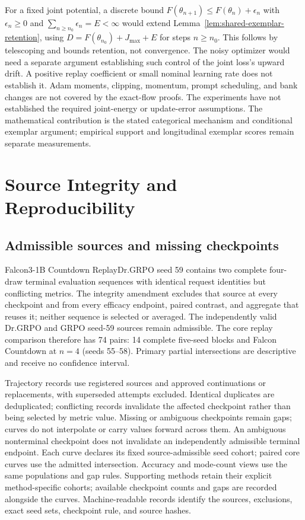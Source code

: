 \documentclass{article}
\newcommand{\1}{\mathbf 1}
\theoremstyle{remark}
\theoremstyle{definition}
\theoremstyle{plain}
\begin{document}
For a fixed joint potential, a discrete bound
$F(\theta_{n+1})\le F(\theta_n)+\epsilon_n$ with
$\epsilon_n\ge0$ and $\sum_{n\ge n_0}\epsilon_n=E<\infty$ would extend
Lemma~\ref{lem:shared-exemplar-retention}, using
$D=F(\theta_{n_0})+J_{\max}+E$ for steps $n\ge n_0$.
This follows by telescoping and bounds retention, not convergence. The noisy
optimizer would need a separate argument establishing such control of the
joint loss's upward drift. A positive replay coefficient or small nominal
learning rate does not establish it. Adam moments, clipping, momentum, prompt
scheduling, and bank changes are not covered by the exact-flow proofs.
The experiments have not established the required joint-energy or
update-error assumptions. The mathematical contribution is the stated
categorical mechanism and conditional exemplar argument; empirical support
and longitudinal exemplar scores remain separate measurements.


\section{Source Integrity and Reproducibility}
\label{app:reproducibility}

\subsection{Admissible sources and missing checkpoints}
\label{app:source-integrity}

Falcon3-1B Countdown ReplayDr.GRPO seed 59 contains two complete four-draw
terminal evaluation sequences with identical request identities but
conflicting metrics. The integrity amendment excludes that source at every
checkpoint and from every efficacy endpoint, paired contrast, and aggregate
that reuses it; neither sequence is selected or averaged. The independently
valid Dr.GRPO and GRPO seed-59 sources remain admissible. The core replay
comparison therefore has 74 pairs: 14 complete five-seed blocks and Falcon
Countdown at $n=4$ (seeds 55--58). Primary partial intersections are
descriptive and receive no confidence interval.

Trajectory records use registered sources and approved continuations or
replacements, with superseded attempts excluded. Identical duplicates are
deduplicated; conflicting records invalidate the affected checkpoint rather
than being selected by metric value. Missing or ambiguous checkpoints remain gaps;
curves do not interpolate or carry values forward across them. An ambiguous
nonterminal checkpoint does not invalidate an independently admissible
terminal endpoint. Each curve declares its fixed source-admissible seed cohort; paired core
curves use the admitted intersection. Accuracy and mode-count views use
the same populations and gap rules. Supporting methods retain their
explicit method-specific cohorts; available checkpoint counts and gaps
are recorded alongside the curves. Machine-readable records identify the
sources, exclusions, exact seed sets, checkpoint rule, and source hashes.
\end{document}
